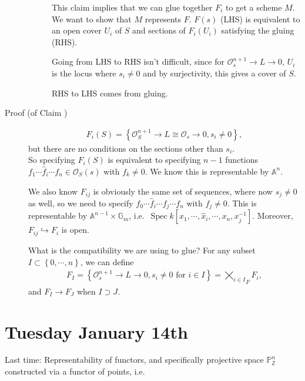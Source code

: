\begin{description}
\begin{description}
This claim implies that we can glue together \(F_i\) to get a scheme
\(M\). We want to show that \(M\) represents \(F\). \(F(s)\) (LHS) is
equivalent to an open cover \(U_i\) of \(S\) and sections of
\(F_i(U_i)\) satisfying the gluing (RHS).

Going from LHS to RHS isn't difficult, since for
\({\mathcal{O}}_s^{n+1} \to L \to 0\), \(U_i\) is the locus where
\(s_i \neq 0\) and by surjectivity, this gives a cover of \(S\).

RHS to LHS comes from gluing.
\end{description}
\item[Proof (of Claim )]
\begin{align*}
F_i(S) = \left\{{{\mathcal{O}}_S^{n+1} \to L \cong {\mathcal{O}}_s \to 0, s_i \neq 0}\right\}
,\end{align*}
but there are no conditions on the sections other than \(s_i\).\\
So specifying \(F_i(S)\) is equivalent to specifying \(n-1\) functions
\(f_1 \cdots \widehat{f}_i \cdots f_n \in {\mathcal{O}}_S(s)\) with
\(f_k \neq 0\). We know this is representable by \({\mathbb{A}}^n\).

We also know \(F_{ij}\) is obviously the same set of sequences, where
now \(s_j \neq 0\) as well, so we need to specify
\(f_0 \cdots \widehat{f}_i \cdots f_j \cdots f_n\) with \(f_j \neq 0\).
This is representable by \({\mathbb{A}}^{n-1} \times{\mathbb{G}}_m\),
i.e.~\(\operatorname{Spec}k[x_1, \cdots, \widehat{x}_i, \cdots, x_n, x_j^{-1}]\).
Moreover, \(F_{ij} \hookrightarrow F_i\) is open.

What is the compatibility we are using to glue? For any subset
\(I \subset \left\{{0, \cdots, n}\right\}\), we can define
\begin{align*}
F_I = \left\{{{\mathcal{O}}_s^{n+1} \to L \to 0, s_i\neq 0 \text{ for } i\in I}\right\} = {\bigtimes_{i\in I}}_F F_i
,\end{align*}
and \(F_I \to F_J\) when \(I \supset J\).
\end{description}

\hypertarget{tuesday-january-14th}{%
\section{Tuesday January 14th}\label{tuesday-january-14th}}

Last time: Representability of functors, and specifically projective
space \({\mathbb{P}}_{\mathbb{Z}}^n\) constructed via a functor of
points, i.e.

